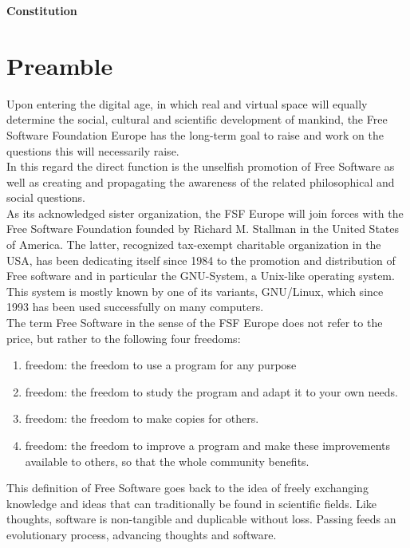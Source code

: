 \documentclass[a4wide,12pt]{article}
\begin{document}

\thispagestyle{empty}
\begin{center}
\Huge\bf Constitution
\end{center}

\section*{Preamble}

Upon entering the digital age, in which real and virtual space will
equally determine the social, cultural and scientific development of
mankind, the Free Software Foundation Europe has the long-term goal to
raise and work on the questions this will necessarily raise.\\

In this regard the direct function is the unselfish promotion of
Free Software as well as creating and propagating the awareness of the
related philosophical and social questions.\\

As its acknowledged sister organization, the FSF Europe will join
forces with the Free Software Foundation founded by Richard
M. Stallman in the United States of America. The latter, recognized
tax-exempt charitable organization in the USA, has been dedicating
itself since 1984 to the promotion and distribution of Free software
and in particular the GNU-System, a Unix-like operating system. This
system is mostly known by one of its variants, GNU/Linux, which since
1993 has been used successfully on many computers.\\

The term Free Software in the sense of the FSF Europe does not refer
to the price, but rather to the following four freedoms:
\begin{enumerate}
\item freedom: the freedom to use a program for any purpose
\item freedom: the freedom to study the program and adapt it to your
own needs. 
\item freedom: the freedom to make copies for others.
\item freedom: the freedom to improve a program and make these
improvements available to others, so that the whole community
benefits. 
\end{enumerate}

This definition of Free Software goes back to the idea of freely
exchanging knowledge and ideas that can traditionally be found in
scientific fields. Like thoughts, software is non-tangible and
duplicable without loss. Passing feeds an evolutionary process,
advancing thoughts and software.\\
\end{document}
